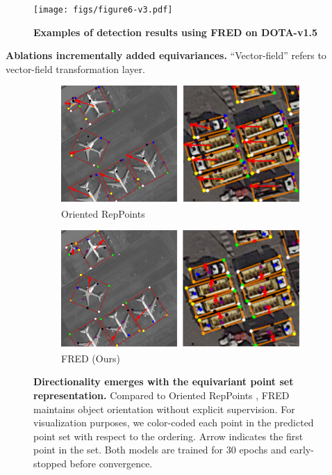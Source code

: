 \documentclass[letterpaper]{article} %
\begin{document}
\begin{figure}[t]
\centering
\texttt{[image: figs/figure6-v3.pdf]} 
\caption{\textbf{Examples of detection results using FRED on DOTA-v1.5}}
\label{fig:figure6}
\end{figure}

\begin{table}[t]
    
\caption{\textbf{Ablations incrementally added equivariances.} ``Vector-field'' refers to vector-field transformation layer. }
\label{table:equivariance-ablation}
\end{table}



\begin{figure}[t]
    \centering
    \begin{subfigure}{.48\linewidth}
        \centering
        \includegraphics[width=\linewidth]{figs/figure7_rep-v2.pdf}
        \caption{Oriented RepPoints}
        \label{fig:previous}
    \end{subfigure}
    \begin{subfigure}{.48\linewidth}
        \centering
        \includegraphics[width=\linewidth]{figs/figure7_ours-v2.pdf}
        \caption{FRED (Ours)}
        \label{fig:proposed}
    \end{subfigure}
    \caption{\textbf{Directionality emerges with the equivariant point set representation.} Compared to Oriented RepPoints \citep{li2022oriented}, FRED maintains object orientation without explicit supervision. For visualization purposes, we color-coded each point in the predicted point set with respect to the ordering. Arrow indicates the first point in the set. Both models are trained for 30 epochs and early-stopped before convergence.}
    \label{fig:figure5}
\end{figure}
\end{document}
